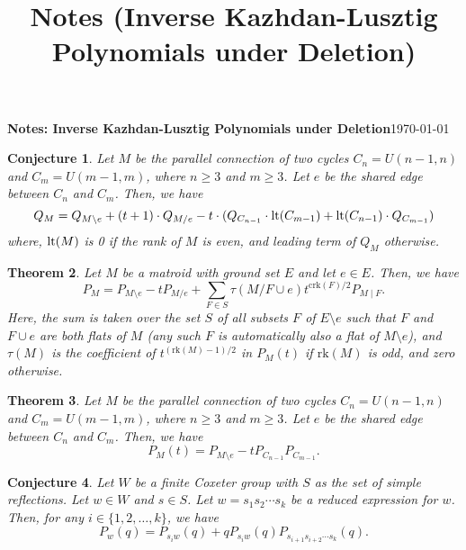 \documentclass[10pt]{article}
\title{Notes (Inverse Kazhdan-Lusztig Polynomials under Deletion)}
\newcommand{\lt}{\normalfont\text{lt}}
\newtheorem{theorem}{Theorem}
\newtheorem{conjecture}[theorem]{Conjecture}
\theoremstyle{remark}
\begin{document}
{\textbf{Notes: Inverse Kazhdan-Lusztig Polynomials under Deletion}}\hfill {\small{\today}}

\hrulefill
\begin{conjecture}
    Let $M$ be the parallel connection of two cycles $C_n = U(n-1, n)$ and $C_m = U(m-1, m)$, where $n \geq 3$ and $m \geq 3$.
    Let $e$ be the shared edge between $C_n$ and $C_m$. Then, we have
    \begin{equation}
        Q_{M} = Q_{M\setminus e} + (t + 1)\cdot Q_{M/e} - t\cdot(Q_{C_{n-1}}\cdot \lt(C_{m-1}) + \lt(C_{n-1})\cdot Q_{C_{m-1}})
        \end{equation}
    where, $\lt(M)$ is 0 if the rank of $M$ is even, and leading term of $Q_M$ otherwise.
    \end{conjecture}

\begin{theorem}
    Let $M$ be a matroid with ground set $E$ and let $e \in E$. Then, we have
    \begin{equation}
        P_M = P_{M \setminus e} - t P_{M / e} + \sum_{F \in S} \tau(M/{F \cup e}) t^{\text{crk} (F)/2} P_{M\mid F}.
    \end{equation}
    Here, the sum is taken over the set $S$ of all subsets $F$ of $E \setminus e$ such that $F$ and $F \cup e$ are both flats of $M$
    (any such $F$ is automatically also a flat of $M \setminus e$), and $\tau(M)$ is the coefficient of
    $t^{(\text{rk} (M) - 1)/2}$ in $P_M(t)$ if $\text{rk} (M)$ is odd, and zero otherwise.
\end{theorem}

\begin{theorem}
    Let $M$ be the parallel connection of two cycles $C_n = U(n-1, n)$ and $C_m = U(m-1, m)$, where $n \geq 3$ and $m \geq 3$. Let $e$ be the shared edge between $C_n$ and $C_m$. Then, we have
    \begin{equation}
        P_M(t) = P_{M \setminus e} - t P_{C_{n-1}}P_{C_{m-1}}.
    \end{equation}
\end{theorem}

\begin{conjecture}
    Let $W$ be a finite Coxeter group with $S$ as the set of simple reflections. Let $w \in W$ and $s \in S$. Let $w = s_1s_2\cdots s_k$ be a reduced expression for $w$. Then, for any $i \in \{1,2,\ldots,k\}$, we have
    \begin{equation}
        P_{w}(q) = P_{s_iw}(q) + qP_{s_iw}(q)P_{s_{i+1}s_{i+2}\cdots s_k}(q).
    \end{equation}
    \end{conjecture}
\end{document}
